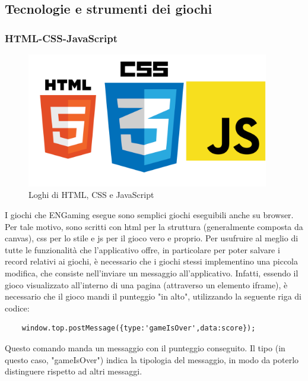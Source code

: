 \subsection{Tecnologie e strumenti dei giochi}

\subsubsection{HTML-CSS-JavaScript}
\begin{figure}[h]
    \centering
    \includegraphics[width=300pt]{images/technologies/HTMLCSSJS.png}
    \caption{Loghi di HTML, CSS e JavaScript}
    \label{fig:HTMLCSSJS}
\end{figure}
I giochi che ENGaming esegue sono semplici giochi eseguibili anche su browser. Per tale motivo, sono scritti con \gls{html} per la struttura (generalmente composta da canvas), \gls{css} per lo stile e \gls{js} per il gioco vero e proprio.
Per usufruire al meglio di tutte le funzionalità che l'applicativo offre, in particolare per poter salvare i record relativi ai giochi, è necessario che i giochi stessi implementino una piccola modifica, che consiste nell'inviare un messaggio all'applicativo.
Infatti, essendo il gioco visualizzato all'interno di una pagina (attraverso un elemento iframe), è necessario che il gioco mandi il punteggio "in alto", utilizzando la seguente riga di codice:
\begin{lstlisting}
    window.top.postMessage({type:'gameIsOver',data:score});
\end{lstlisting}
Questo comando manda un messaggio con il punteggio conseguito. Il tipo (in questo caso, "gameIsOver") indica la tipologia del messaggio, in modo da poterlo distinguere rispetto ad altri messaggi.
\newpage
